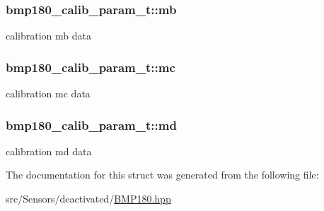 \subsubsection[{\texorpdfstring{mb}{mb}}]{ bmp180\+\_\+calib\+\_\+param\+\_\+t\+::mb}\hypertarget{structbmp180__calib__param__t_a64bdabef2d55201e68ee49299b966282}{}\label{structbmp180__calib__param__t_a64bdabef2d55201e68ee49299b966282}
calibration mb data 
\subsubsection[{\texorpdfstring{mc}{mc}}]{ bmp180\+\_\+calib\+\_\+param\+\_\+t\+::mc}\hypertarget{structbmp180__calib__param__t_a5abaaaa05802e6d9b2653182e31f655d}{}\label{structbmp180__calib__param__t_a5abaaaa05802e6d9b2653182e31f655d}
calibration mc data 
\subsubsection[{\texorpdfstring{md}{md}}]{ bmp180\+\_\+calib\+\_\+param\+\_\+t\+::md}\hypertarget{structbmp180__calib__param__t_aab92deab6ac7b3bd24feda15460509c3}{}\label{structbmp180__calib__param__t_aab92deab6ac7b3bd24feda15460509c3}
calibration md data 

The documentation for this struct was generated from the following file\+:\begin{DoxyCompactItemize}
\item 
src/\+Sensors/deactivated/\hyperlink{BMP180_8hpp}{B\+M\+P180.\+hpp}\end{DoxyCompactItemize}
